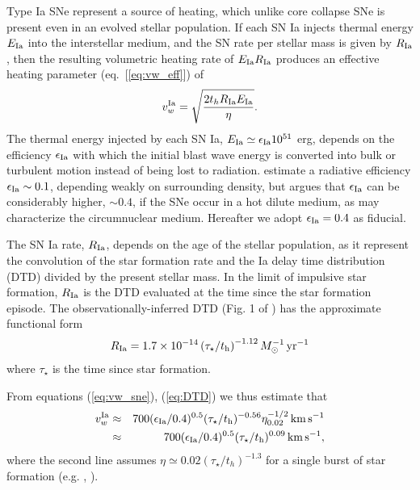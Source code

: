 \documentclass[usenatbib,fleqn]{mn2e}
\newcommand{\RateIa}{R_{\rm Ia}}
\begin{document}
Type Ia SNe represent a source of heating, which unlike core collapse
SNe is present even in an evolved stellar population.  If each SN Ia
injects thermal energy $E_{\rm Ia}$ into the interstellar medium, and
the SN rate per stellar mass is given by $R_{\rm Ia}$, then the
resulting volumetric heating rate of $E_{\rm Ia}R_{\rm Ia}$ produces
an effective heating parameter (eq.~[\ref{eq:vw_eff}])
of \begin{align} v_{w}^{\rm Ia} =\sqrt{\frac{2 t_h R_{\rm Ia} E_{\rm
        Ia}}{\eta}} \label{eq:vw_sne}.
\end{align} The thermal energy injected by each SN Ia, $E_{\rm Ia} \simeq
\epsilon_{\rm Ia} 10^{51}$ erg, depends on the efficiency $\epsilon_{\rm Ia}$
with which the initial blast wave energy is converted into bulk or turbulent
motion instead of being lost to radiation.  \cite{Thornton+98}
estimate a radiative efficiency $\epsilon_{\rm Ia} \sim 0.1$,
depending weakly on surrounding density, but \citet{Sharma+14} argues
that $\epsilon_{\rm Ia}$ can be considerably higher, $\sim 0.4$, if
the SNe occur in a hot dilute medium, as may characterize the circumnuclear medium.  Hereafter we adopt $\epsilon_{\rm Ia} = 0.4$ as fiducial.

The SN Ia rate, $\RateIa$, depends on the age of the stellar
population, as it represent the convolution of the star formation rate
and the Ia delay time distribution (DTD) divided by the present
stellar mass.  In the limit of impulsive star formation, $\RateIa$ is
the DTD evaluated at the time since the star formation episode.  The
observationally-inferred DTD (Fig. 1 of \citealt{MaozMannucci+:2012a})
has the approximate functional form \begin{align} R_{\rm Ia}
  =1.7\times 10^{-14}\left(\tau_{\star}/t_{\rm h}\right)^{-1.12}
  M_{\odot}^{-1}\,{\rm yr^{-1}}
\label{eq:DTD}
  \end{align}
  where $\tau_{\star}$ is the time since star formation.

From equations (\ref{eq:vw_sne}), (\ref{eq:DTD}) we thus estimate that 
  \begin{eqnarray} 
    v_{w}^{\rm Ia} &\approx& 700(\epsilon_{\rm
      Ia}/0.4)^{0.5}(\tau_{\star}/t_{\rm h})^{-0.56}\eta_{0.02}^{-1/2}\,{\rm km
      \,s^{-1}} \nonumber \\
&\approx& 700(\epsilon_{\rm
      Ia}/0.4)^{0.5}(\tau_{\star}/t_{\rm h})^{0.09}\,{\rm km
      \,s^{-1}},
\label{eq:vIa}
  \end{eqnarray}
  where the second line assumes $\eta\simeq 0.02
  (\tau_{\star}/t_h)^{-1.3}$ for a single burst of star formation
  (e.g. , \citealt{Ciotti+91}).
\end{document}
